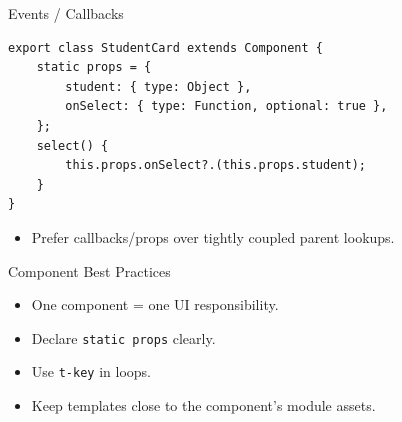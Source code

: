 \begin{frame}[fragile]{Events / Callbacks}
\begin{lstlisting}[style=js]
export class StudentCard extends Component {
	static props = {
		student: { type: Object },
		onSelect: { type: Function, optional: true },
	};
	select() {
		this.props.onSelect?.(this.props.student);
	}
}
\end{lstlisting}
	\begin{itemize}
		\item Prefer callbacks/props over tightly coupled parent lookups.
	\end{itemize}
\end{frame}

\begin{frame}{Component Best Practices}
	\begin{itemize}
		\item One component = one UI responsibility.
		\item Declare \texttt{static props} clearly.
		\item Use \texttt{t-key} in loops.
		\item Keep templates close to the component's module assets.
	\end{itemize}
\end{frame}
